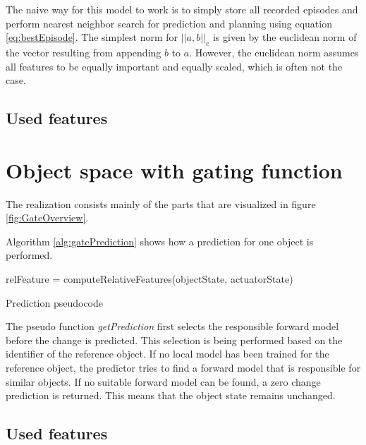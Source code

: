 The naive way for this model to work is to simply store all recorded episodes and perform nearest neighbor search for prediction and planning using equation \ref{eq:bestEpisode}. The simplest norm for $||a,b||_e$ is given by the euclidean norm of the vector resulting from appending $b$ to $a$. However, the euclidean norm assumes all features to be equally important and equally scaled, which is often not the case.




\subsection{Used features \label{sec:intFeatures}}



\section{Object space with gating function \label{sec:gateRealization}}

The realization consists mainly of the parts that are visualized in figure \ref{fig:GateOverview}. 

Algorithm \ref{alg:gatePrediction} shows how a prediction for one object is performed. 


\begin{algorithm}
	\BlankLine
	relFeature = computeRelativeFeatures(objectState, actuatorState)\\
	\caption{Prediction pseudocode}
	\label{alg:gatePrediction}
\end{algorithm}

The pseudo function \textit{getPrediction} first selects the responsible forward model before the change is predicted. This selection is being performed based on the identifier of the reference object. If no local model has been trained for the reference object, the predictor tries to find a forward model that is responsible for similar objects. If no suitable forward model can be found, a zero change prediction is returned. This means that the object state remains unchanged.


\subsection{Used features}


